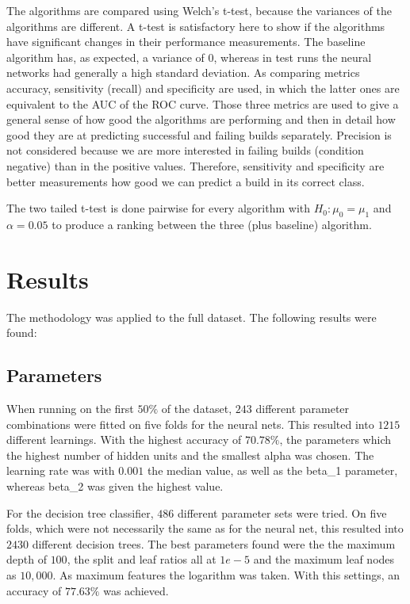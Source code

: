 \documentclass[a4paper,11pt]{article}
\begin{document}
The algorithms are compared using Welch's t-test, because the variances of the algorithms are different. A t-test is satisfactory here to show if the algorithms have significant changes in their performance measurements. The baseline algorithm has, as expected, a variance of 0, whereas in test runs the neural networks had generally a high standard deviation. As comparing metrics accuracy, sensitivity (recall) and specificity are used, in which the latter ones are equivalent to the AUC of the ROC curve. Those three metrics are used to give a general sense of how good the algorithms are performing and then in detail how good they are at predicting successful and failing builds separately. Precision is not considered because we are more interested in failing builds (condition negative) than in the positive values. Therefore, sensitivity and specificity are better measurements how good we can predict a build in its correct class.

The two tailed t-test is done pairwise for every algorithm with  $H_0 : \mu_0 = \mu_1$ and $\alpha=0.05$ to produce a ranking between the three (plus baseline) algorithm. 


\section{Results}

The methodology was applied to the full dataset. The following results were found:

\subsection{Parameters}

When running on the first $50\%$ of the dataset, $243$ different parameter combinations were fitted on five folds for the neural nets. This resulted into $1215$ different learnings. With the highest accuracy of $70.78\%$, the parameters which the highest number of hidden units and the smallest alpha was chosen. The learning rate was with $0.001$ the median value, as well as the  beta\_1 parameter, whereas beta\_2 was given the highest value. 

For the decision tree classifier, $486$ different parameter sets were tried. On five folds, which were not necessarily the same as for the neural net, this resulted into $2430$ different decision trees.
The best parameters found were the the maximum depth of $100$, the split and leaf ratios all at $1e-5$ and the maximum leaf nodes as $10,000$. As maximum features the logarithm was taken. With this settings, an accuracy of $77.63\%$ was achieved. 
\end{document}
